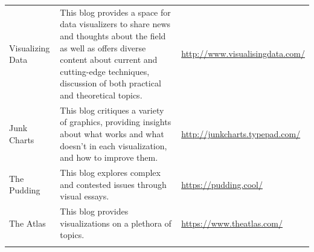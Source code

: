\documentclass[]{book}
\begin{document}
\begin{longtable}[]{@{}lll@{}}
\begin{minipage}[t]{0.11\columnwidth}
Visualizing Data\strut
\end{minipage} & \begin{minipage}[t]{0.20\columnwidth}\raggedright\strut
This blog provides a space for data visualizers to share news and
thoughts about the field as well as offers diverse content about current
and cutting-edge techniques, discussion of both practical and
theoretical topics.\strut
\end{minipage} & \begin{minipage}[t]{0.11\columnwidth}\raggedright\strut
\url{http://www.visualisingdata.com/}\strut
\end{minipage}\tabularnewline
\begin{minipage}[t]{0.11\columnwidth}\raggedright\strut
Junk Charts\strut
\end{minipage} & \begin{minipage}[t]{0.20\columnwidth}\raggedright\strut
This blog critiques a variety of graphics, providing insights about what
works and what doesn't in each visualization, and how to improve
them.\strut
\end{minipage} & \begin{minipage}[t]{0.11\columnwidth}\raggedright\strut
\url{http://junkcharts.typepad.com/}\strut
\end{minipage}\tabularnewline
\begin{minipage}[t]{0.11\columnwidth}\raggedright\strut
The Pudding\strut
\end{minipage} & \begin{minipage}[t]{0.20\columnwidth}\raggedright\strut
This blog explores complex and contested issues through visual
essays.\strut
\end{minipage} & \begin{minipage}[t]{0.11\columnwidth}\raggedright\strut
\url{https://pudding.cool/}\strut
\end{minipage}\tabularnewline
\begin{minipage}[t]{0.11\columnwidth}\raggedright\strut
The Atlas\strut
\end{minipage} & \begin{minipage}[t]{0.20\columnwidth}\raggedright\strut
This blog provides visualizations on a plethora of topics.\strut
\end{minipage} & \begin{minipage}[t]{0.11\columnwidth}\raggedright\strut
\url{https://www.theatlas.com/}\strut
\end{minipage}\tabularnewline
\begin{minipage}[t]{0.11\columnwidth}\raggedright\strut

\end{minipage}
\end{longtable}
\end{document}
